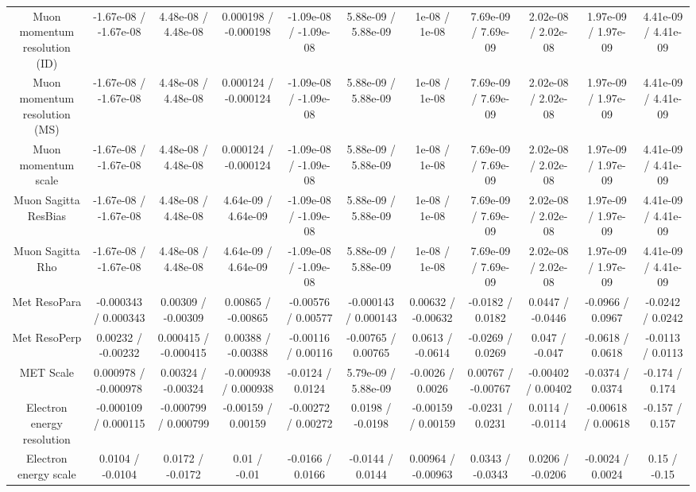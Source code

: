 \begin{table}[htbp]
\begin{center}
\begin{tabular}{|c|c|c|c|c|c|c|c|c|c|c|}
  Muon momentum resolution (ID) & -1.67e-08 / -1.67e-08 & 4.48e-08 / 4.48e-08 & 0.000198 / -0.000198 & -1.09e-08 / -1.09e-08 & 5.88e-09 / 5.88e-09 & 1e-08 / 1e-08 & 7.69e-09 / 7.69e-09 & 2.02e-08 / 2.02e-08 & 1.97e-09 / 1.97e-09 & 4.41e-09 / 4.41e-09 \\ 
  Muon momentum resolution (MS) & -1.67e-08 / -1.67e-08 & 4.48e-08 / 4.48e-08 & 0.000124 / -0.000124 & -1.09e-08 / -1.09e-08 & 5.88e-09 / 5.88e-09 & 1e-08 / 1e-08 & 7.69e-09 / 7.69e-09 & 2.02e-08 / 2.02e-08 & 1.97e-09 / 1.97e-09 & 4.41e-09 / 4.41e-09 \\ 
  Muon momentum scale & -1.67e-08 / -1.67e-08 & 4.48e-08 / 4.48e-08 & 0.000124 / -0.000124 & -1.09e-08 / -1.09e-08 & 5.88e-09 / 5.88e-09 & 1e-08 / 1e-08 & 7.69e-09 / 7.69e-09 & 2.02e-08 / 2.02e-08 & 1.97e-09 / 1.97e-09 & 4.41e-09 / 4.41e-09 \\ 
  Muon Sagitta ResBias & -1.67e-08 / -1.67e-08 & 4.48e-08 / 4.48e-08 & 4.64e-09 / 4.64e-09 & -1.09e-08 / -1.09e-08 & 5.88e-09 / 5.88e-09 & 1e-08 / 1e-08 & 7.69e-09 / 7.69e-09 & 2.02e-08 / 2.02e-08 & 1.97e-09 / 1.97e-09 & 4.41e-09 / 4.41e-09 \\ 
  Muon Sagitta Rho & -1.67e-08 / -1.67e-08 & 4.48e-08 / 4.48e-08 & 4.64e-09 / 4.64e-09 & -1.09e-08 / -1.09e-08 & 5.88e-09 / 5.88e-09 & 1e-08 / 1e-08 & 7.69e-09 / 7.69e-09 & 2.02e-08 / 2.02e-08 & 1.97e-09 / 1.97e-09 & 4.41e-09 / 4.41e-09 \\ 
  Met ResoPara & -0.000343 / 0.000343 & 0.00309 / -0.00309 & 0.00865 / -0.00865 & -0.00576 / 0.00577 & -0.000143 / 0.000143 & 0.00632 / -0.00632 & -0.0182 / 0.0182 & 0.0447 / -0.0446 & -0.0966 / 0.0967 & -0.0242 / 0.0242 \\ 
  Met ResoPerp & 0.00232 / -0.00232 & 0.000415 / -0.000415 & 0.00388 / -0.00388 & -0.00116 / 0.00116 & -0.00765 / 0.00765 & 0.0613 / -0.0614 & -0.0269 / 0.0269 & 0.047 / -0.047 & -0.0618 / 0.0618 & -0.0113 / 0.0113 \\ 
  MET Scale & 0.000978 / -0.000978 & 0.00324 / -0.00324 & -0.000938 / 0.000938 & -0.0124 / 0.0124 & 5.79e-09 / 5.88e-09 & -0.0026 / 0.0026 & 0.00767 / -0.00767 & -0.00402 / 0.00402 & -0.0374 / 0.0374 & -0.174 / 0.174 \\ 
  Electron energy resolution & -0.000109 / 0.000115 & -0.000799 / 0.000799 & -0.00159 / 0.00159 & -0.00272 / 0.00272 & 0.0198 / -0.0198 & -0.00159 / 0.00159 & -0.0231 / 0.0231 & 0.0114 / -0.0114 & -0.00618 / 0.00618 & -0.157 / 0.157 \\ 
  Electron energy scale & 0.0104 / -0.0104 & 0.0172 / -0.0172 & 0.01 / -0.01 & -0.0166 / 0.0166 & -0.0144 / 0.0144 & 0.00964 / -0.00963 & 0.0343 / -0.0343 & 0.0206 / -0.0206 & -0.0024 / 0.0024 & 0.15 / -0.15 \\ 

\end{tabular}
\end{center}
\end{table}
